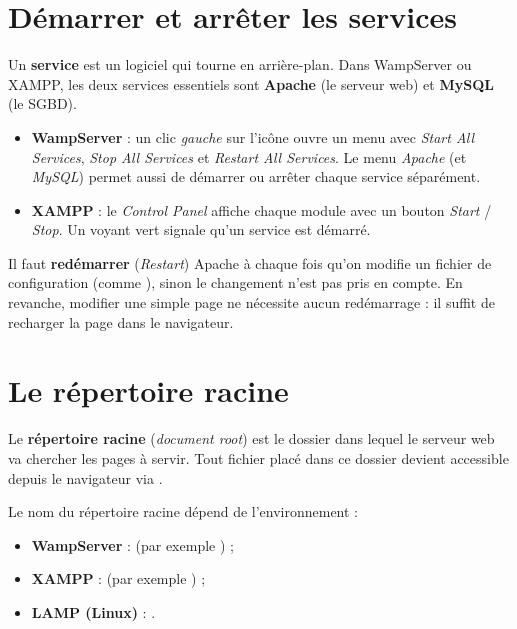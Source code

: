 \section{Démarrer et arrêter les services}

Un \textbf{service} est un logiciel qui tourne en arrière-plan. Dans WampServer ou
XAMPP, les deux services essentiels sont \textbf{Apache} (le serveur web) et
\textbf{MySQL} (le SGBD).

\begin{itemize}
  \item \textbf{WampServer} : un clic \emph{gauche} sur l'icône ouvre un menu avec
        \emph{Start All Services}, \emph{Stop All Services} et \emph{Restart All
        Services}. Le menu \emph{Apache} (et \emph{MySQL}) permet aussi de démarrer
        ou arrêter chaque service séparément.
  \item \textbf{XAMPP} : le \emph{Control Panel} affiche chaque module avec un bouton
        \emph{Start} / \emph{Stop}. Un voyant vert signale qu'un service est démarré.
\end{itemize}

\begin{remarque}
Il faut \textbf{redémarrer} (\emph{Restart}) Apache à chaque fois qu'on modifie un
fichier de configuration (comme ), sinon le changement n'est pas pris
en compte. En revanche, modifier une simple page  ne nécessite aucun
redémarrage : il suffit de recharger la page dans le navigateur.
\end{remarque}

\section{Le répertoire racine}

\begin{definition}
Le \textbf{répertoire racine} (\emph{document root}) est le dossier dans lequel le
serveur web va chercher les pages à servir. Tout fichier placé dans ce dossier
devient accessible depuis le navigateur via .
\end{definition}

Le nom du répertoire racine dépend de l'environnement :
\begin{itemize}
  \item \textbf{WampServer} :  (par exemple ) ;
  \item \textbf{XAMPP} :  (par exemple ) ;
  \item \textbf{LAMP (Linux)} : .
\end{itemize}

